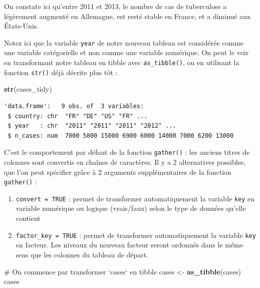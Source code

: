 \documentclass[a4paperpaper,]{article}
\newenvironment{Shaded}{\begin{snugshade}}{\end{snugshade}}
\newcommand{\CommentTok}[1]{\textcolor[rgb]{0.54,0.53,0.53}{#1}}
\newcommand{\KeywordTok}[1]{\textcolor[rgb]{0.12,0.11,0.11}{\textbf{#1}}}
\newcommand{\NormalTok}[1]{\textcolor[rgb]{0.12,0.11,0.11}{#1}}
\newcommand{\StringTok}[1]{\textcolor[rgb]{0.75,0.01,0.01}{#1}}
\providecommand{\tightlist}{%
  \setlength{\itemsep}{0pt}\setlength{\parskip}{0pt}}
\begin{document}
On constate ici qu'entre 2011 et 2013, le nombre de cas de tuberculose a légèrement augmenté en Allemagne, est resté stable en France, et a diminué aux États-Unis.

Notez ici que la variable \texttt{year} de notre nouveau tableau est considérée comme une variable catégorielle et non comme une variable numérique. On peut le voir en transformant notre tableau en tibble avec \texttt{as\_tibble()}, ou en utilisant la fonction \texttt{str()} déjà décrite plus tôt :

\begin{Shaded}
\begin{Highlighting}[]
\KeywordTok{str}\NormalTok{(cases_tidy)}
\end{Highlighting}
\end{Shaded}

\begin{verbatim}
'data.frame':   9 obs. of  3 variables:
 $ country: chr  "FR" "DE" "US" "FR" ...
 $ year   : chr  "2011" "2011" "2011" "2012" ...
 $ n_cases: num  7000 5800 15000 6900 6000 14000 7000 6200 13000
\end{verbatim}

C'est le comportement par défaut de la fonction \texttt{gather()} : les anciens titres de colonnes sont convertis en chaînes de caractères. Il y a 2 alternatives possibles, que l'on peut spécifier grâce à 2 arguments supplémentaires de la fonction \texttt{gather()} :

\begin{enumerate}
\def\labelenumi{\arabic{enumi}.}
\tightlist
\item
  \texttt{convert\ =\ TRUE} : permet de transformer automatiquement la variable \texttt{key} en variable numérique ou logique (vrais/faux) selon le type de données qu'elle contient
\item
  \texttt{factor\_key\ =\ TRUE} : permet de transformer automatiquement la variable \texttt{key} en facteur. Les niveaux du nouveau facteur seront ordonnés dans le même sens que les colonnes du tableau de départ.
\end{enumerate}

\begin{Shaded}
\begin{Highlighting}[]
\CommentTok{# On commence par transformer `cases` en tibble}
\NormalTok{cases <-}\StringTok{ }\KeywordTok{as_tibble}\NormalTok{(cases)}
\NormalTok{cases}
\end{Highlighting}
\end{Shaded}
\end{document}
